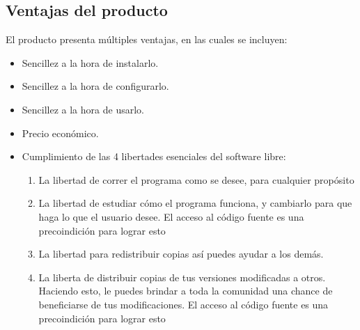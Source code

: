 \documentclass{article}
\begin{document}
\subsection{Ventajas del producto}
El producto presenta múltiples ventajas, en las cuales se incluyen:
\begin{itemize}
	\item Sencillez a la hora de instalarlo.
	\item Sencillez a la hora de configurarlo.
	\item Sencillez a la hora de usarlo.
	\item Precio económico.
	\item Cumplimiento de las 4 libertades esenciales del software libre:
	      \begin{enumerate}
		      \item La libertad de correr el programa como se desee, para cualquier propósito
		      \item La libertad de estudiar cómo el programa funciona, y cambiarlo para que
		            haga lo que el usuario desee.
		            El acceso al código fuente es una precoindición para lograr esto
		      \item La libertad para redistribuir copias así puedes ayudar a los demás.
		      \item La liberta de distribuir copias de tus versiones modificadas a otros.
		            Haciendo esto, le puedes brindar a toda la comunidad una chance de beneficiarse
		            de tus modificaciones.
		            El acceso al código fuente es una precoindición para lograr esto
	      \end{enumerate}
\end{itemize}

\vspace{2em}
\end{document}
